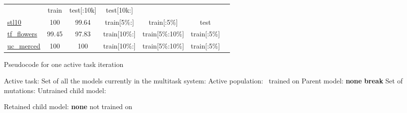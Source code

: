 \documentclass{article} \usepackage{iclr2023_conference,times}
\begin{document}
\begin{table*}[h]
\begin{tabular}{lcccccc}
 & train & test[{\tiny:10k}] & test[{\tiny10k:}] & 
 \citep{Song2016DeepML}
 \\
\href{https://www.tensorflow.org/datasets/catalog/stl10}{stl10}
&  100  &  99.64
 & train[{\tiny5\%:}] & train[{\tiny:5\%}] & test &
 \citep{Coates2011AnAO}
 \\
\href{https://www.tensorflow.org/datasets/catalog/tf_flowers}{tf\_flowers}
&  99.45  &  97.83
 & train[{\tiny10\%:}] & train[{\tiny5\%:10\%}] & train[{\tiny:5\%}] &
  \\
\href{https://www.tensorflow.org/datasets/catalog/uc_merced}{uc\_merced}
&  100  &  100
 & train[{\tiny10\%:}] & train[{\tiny5\%:10\%}] & train[{\tiny:5\%}] &
 \citep{Yang2010BagofvisualwordsAS}
 \\

    \bottomrule
  \end{tabular}
\end{table*}

\clearpage

\begin{algorithm}
\caption{Pseudocode for one active task iteration}
\label{algo}
\begin{algorithmic}[1]
\State Active task: 
\State Set of all the models currently in the multitask system: 
\State Active population: \ trained on  \For{}
    \For{}
        \State {}
        \State Parent model:  \textbf{none}
            \If{}
                \State 
                \State \textbf{break}
            \EndIf
        \EndFor
            \State 
        \EndIf
        \State  {}
        \State Set of mutations: 
            \If{}
                \State  
            \EndIf
        \EndFor
        \State Untrained child model: 

        \State  {}
        \State Retained child model:  \textbf{none}
        \For{}
            \State 
                \State 
            \EndIf
        \EndFor
            \State 
        \EndIf
    \EndFor
\EndFor
\State {}
\State  not trained on 

\end{algorithmic}
\end{algorithm}
\end{document}
